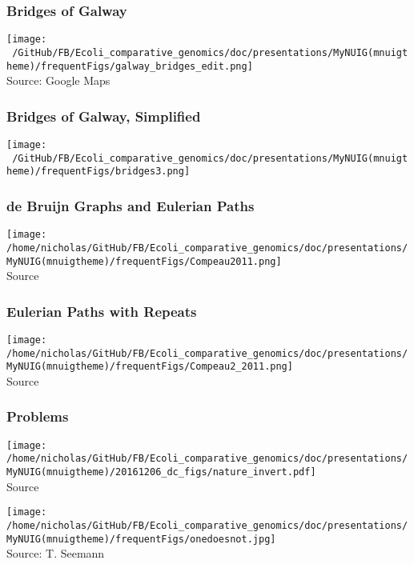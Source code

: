\documentclass[10pt, compress]{beamer}
\begin{document}
\begin{frame}[fragile]
  \frametitle{Bridges of Galway}
  \centering
  \texttt{[image: ~/GitHub/FB/Ecoli\_comparative\_genomics/doc/presentations/MyNUIG(mnuigtheme)/frequentFigs/galway\_bridges\_edit.png]}\\\tiny {Source: Google Maps}
\end{frame}

\begin{frame}[fragile]
  \frametitle{Bridges of Galway, Simplified}
  \centering
  \hspace*{3cm}
  \texttt{[image: ~/GitHub/FB/Ecoli\_comparative\_genomics/doc/presentations/MyNUIG(mnuigtheme)/frequentFigs/bridges3.png]}
\end{frame}

\begin{frame}[fragile]
  \frametitle{de Bruijn Graphs and Eulerian Paths}
  \centering
  \texttt{[image: /home/nicholas/GitHub/FB/Ecoli\_comparative\_genomics/doc/presentations/MyNUIG(mnuigtheme)/frequentFigs/Compeau2011.png]}\\\tiny {Source\cite{Compeau2011}}
\end{frame}


\begin{frame}[fragile]
  \frametitle{Eulerian Paths with Repeats}
  \texttt{[image: /home/nicholas/GitHub/FB/Ecoli\_comparative\_genomics/doc/presentations/MyNUIG(mnuigtheme)/frequentFigs/Compeau2\_2011.png]}\\\tiny {Source\cite{Compeau2011}}
\end{frame}

\begin{frame}[fragile]
  \frametitle{Problems}
  \centering
  \texttt{[image: /home/nicholas/GitHub/FB/Ecoli\_comparative\_genomics/doc/presentations/MyNUIG(mnuigtheme)/20161206\_dc\_figs/nature\_invert.pdf]}\\\tiny {Source\cite{Chaisson2015}}
\end{frame}

\begin{frame}[fragile]
  \centering
  \texttt{[image: /home/nicholas/GitHub/FB/Ecoli\_comparative\_genomics/doc/presentations/MyNUIG(mnuigtheme)/frequentFigs/onedoesnot.jpg]}\\\tiny {Source: T. Seemann}
\end{frame}
\end{document}
